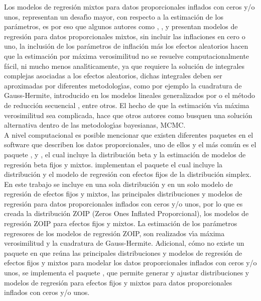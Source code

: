 Los modelos de regresi\'{o}n mixtos para datos proporcionales inflados con ceros y/o unos, re\-pre\-sen\-tan un desaf\'{\i}o mayor, con respecto a la estimaci\'{o}n de los par\'{a}metros, es por eso que algunos autores como \cite{Usuga1}, \cite{Bonat2}, \cite{Song1} y \cite{Stasinopoulos2} presentan modelos de regresi\'{o}n para datos proporcionales mixtos, sin incluir las inflaciones en cero o uno, la inclusi\'{o}n de los par\'{a}metros de inflaci\'{o}n m\'{a}s los efectos aleatorios hacen que la estimaci\'{o}n por m\'{a}xima verosimilitud no se resuelve computacionalmente f\'{a}cil, ni mucho menos anal\'{\i}ticamente, ya que requiere la soluci\'{o}n de integrales complejas asociadas a los efectos aleatorios, dichas integrales deben ser aproximadas por diferentes metodolog\'{\i}as, como por ejemplo la cuadratura de Gauss-Hermite, introducido en los modelos lineales generalizados por \cite{Fahrmeir1} o el m\'{e}todo de reducci\'{o}n secuencial \citep{Ogden1}, entre otros. El hecho de que la estimaci\'{o}n v\'{\i}a m\'{a}xima verosimilitud sea complicada, hace que otros autores como \cite{Galvis1} busquen una soluci\'{o}n alternativa dentro de las metodolog\'{\i}as bayesianas, MCMC.\\

A nivel computacional es posible mencionar que existen diferentes paquetes en el software  que describen los datos proporcionales, uno de ellos y el m\'{a}s com\'{u}n es el paquete  \citep{Zeileis1}, \citep{Ferrari1} y \citep{Simas1}, el cual incluye la distribuci\'{o}n beta y la estimaci\'{o}n de modelos de regresi\'{o}n beta fijos y mixtos. \cite{Qiu1} implementan el paquete  el cual incluye la distribuci\'{o}n y el modelo de regresi\'{o}n con efectos fijos de la distribuci\'{o}n simplex.\\

En este trabajo se incluye en una sola distribuci\'{o}n y en un solo modelo de regresi\'{o}n de efectos fijos y mixtos, las principales distribuciones y modelos de regresi\'{o}n para datos proporcionales inflados con ceros y/o unos, por lo que es creada la distribuci\'{o}n ZOIP (Zeros Ones Inflated Proporcional), los modelos de regresi\'{o}n ZOIP para efectos fijos y mixtos. La estimaci\'{o}n de los par\'{a}metros regresores de los modelos de regresi\'{o}n ZOIP, son realizados v\'{\i}a m\'{a}xima verosimilitud y la cuadratura de Gauss-Hermite. Adicional, c\'{o}mo no existe un paquete en  que re\'{u}na las principales distribuciones y modelos de regresi\'{o}n de efectos fijos y mixtos para modelar los datos proporcionales inflados con ceros y/o unos, se implementa el paquete , que permite generar y ajustar distribuciones y modelos de regresi\'{o}n para efectos fijos y mixtos para datos proporcionales inflados con ceros y/o unos.

